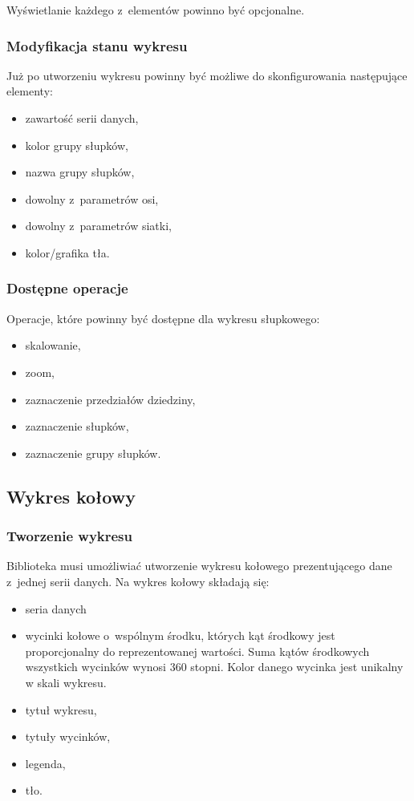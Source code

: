 \documentclass[11pt,twoside,a4paper,final]{article}
\begin{document}
Wyświetlanie każdego z~elementów powinno być opcjonalne. 
\subsubsection{Modyfikacja stanu wykresu}
Już po utworzeniu wykresu powinny być możliwe do skonfigurowania następujące elementy:
\begin{itemize}
\item{zawartość serii danych,}
\item{kolor grupy słupków,}
\item{nazwa grupy słupków,}
\item{dowolny z~parametrów osi,}
\item{dowolny z~parametrów siatki,}
\item{kolor/grafika tła.}
\end{itemize}

\subsubsection{Dostępne operacje}
Operacje, które powinny być dostępne dla wykresu słupkowego:
\begin{itemize}
\item{skalowanie,}
\item{zoom,}
\item{zaznaczenie przedziałów dziedziny,}
\item{zaznaczenie słupków,}
\item{zaznaczenie grupy słupków.}
\end{itemize}


\subsection{Wykres kołowy}
\subsubsection{Tworzenie wykresu}
Biblioteka musi umożliwiać utworzenie wykresu kołowego prezentującego dane z~jednej serii danych. Na wykres kołowy składają się:
\begin{itemize}
\item{seria danych}
\item{wycinki kołowe o~wspólnym środku, których kąt środkowy jest proporcjonalny do reprezentowanej wartości. Suma kątów środkowych wszystkich wycinków wynosi 360 stopni. Kolor danego wycinka jest unikalny w skali wykresu.}
\item{tytuł wykresu,}
\item{tytuły wycinków,}
\item{legenda,}
\item{tło.}
\end{itemize}
\end{document}
